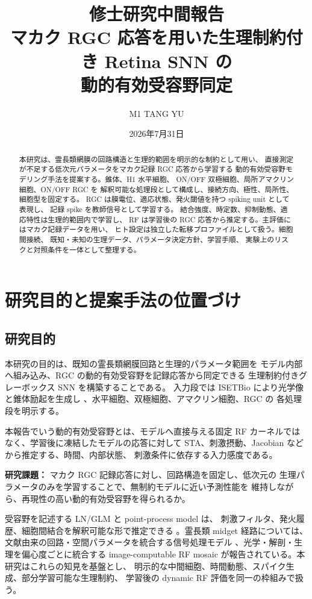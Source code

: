 \documentclass[a4paper,10pt,twocolumn,uplatex,dvipdfmx]{jsarticle}
\title{\textbf{修士研究中間報告\\
マカク RGC 応答を用いた生理制約付き Retina SNN の\\
動的有効受容野同定}}
\author{M1 TANG YU}
\date{2026年7月31日}
\begin{document}
\maketitle

\begin{abstract}
本研究は、霊長類網膜の回路構造と生理的範囲を明示的な制約として用い、
直接測定が不足する低次元パラメータをマカク記録 RGC 応答から学習する
動的有効受容野モデリング手法を提案する。錐体、H1 水平細胞、
ON/OFF 双極細胞、局所アマクリン細胞、ON/OFF RGC を
解釈可能な処理段として構成し、接続方向、極性、局所性、細胞型を固定する。
RGC は膜電位、適応状態、発火閾値を持つ spiking unit として表現し、
記録 spike を教師信号として学習する。
結合強度、時定数、抑制動態、適応特性は生理的範囲内で学習し、
RF は学習後の RGC 応答から推定する。主評価にはマカク記録データを用い、
ヒト設定は独立した転移プロファイルとして扱う。細胞間接続、
既知・未知の生理データ、パラメータ決定方針、学習手順、
実験上のリスクと対照条件を一体として整理する。
\end{abstract}


\section{研究目的と提案手法の位置づけ}

\subsection{研究目的}

本研究の目的は、既知の霊長類網膜回路と生理的パラメータ範囲を
モデル内部へ組み込み、RGC の動的有効受容野を記録応答から同定できる
生理制約付きグレーボックス SNN を構築することである。
入力段では ISETBio により光学像と錐体励起を生成し
\cite{brainard2015}、水平細胞、双極細胞、アマクリン細胞、RGC の
各処理段を明示する。

本報告でいう動的有効受容野とは、モデルへ直接与える固定 RF
カーネルではなく、学習後に凍結したモデルの応答に対して
STA、刺激摂動、Jacobian などから推定する、時間、内部状態、
刺激条件に依存する入力感度である。

\noindent\textbf{研究課題：}
マカク RGC 記録応答に対し、回路構造を固定し、低次元の
生理パラメータのみを学習することで、無制約モデルに近い予測性能を
維持しながら、再現性の高い動的有効受容野を得られるか。

受容野を記述する LN/GLM と point-process model は、
刺激フィルタ、発火履歴、細胞間結合を解釈可能な形で推定できる
\cite{pillow2008}。霊長類 midget 経路については、
文献由来の回路・空間パラメータを統合する信号処理モデル
\cite{somaratna2025}、光学・解剖・生理を偏心度ごとに統合する
image-computable RF mosaic
\cite{cottaris2026} が報告されている。本研究はこれらの知見を基盤とし、
明示的な中間細胞、時間動態、スパイク生成、部分学習可能な生理制約、
学習後の dynamic RF 評価を同一の枠組みで扱う。
\end{document}
